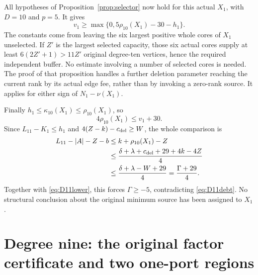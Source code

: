 \documentclass[11pt,a4paper]{article}
\theoremstyle{definition}
\begin{document}
All hypotheses of Proposition~\ref{prop:selector} now hold for this
actual \(X_1\), with \(D=10\) and \(p=5\).  It gives
\[
 v_1\ge\max\{0,5\rho_{10}(X_1)-30-h_1\}.
\]
The constants come from leaving the six largest positive whole cores
of \(X_1\) unselected.  If \(Z'\) is the largest selected capacity,
those six actual cores supply at least \(6(2Z'+1)>11Z'\) original
degree-ten vertices, hence the required independent buffer.
No estimate involving a number of selected cores is needed.
The proof of that proposition handles a further deletion parameter
reaching the current rank by its actual edge fee, rather than by
invoking a zero-rank source.  It applies for either sign of
\(N_1-\nu(X_1)\).

Finally \(h_1\le\kappa_{10}(X_1)\le\rho_{10}(X_1)\), so
\[
 4\rho_{10}(X_1)\le v_1+30.
\]
Since \(L_{11}-K_1\le h_1\) and
\(4(Z-k)-c_{\rm del}\ge W\), the whole comparison is
\[
\begin{aligned}
 L_{11}-|A|-Z-b
 &\le k+\rho_{10}(X_1)-Z\\
 &\le \frac{\delta+\lambda+c_{\rm del}+29+4k-4Z}{4}\\
 &\le \frac{\delta+\lambda-W+29}{4}
  =\frac{\Gamma+29}{4}.
\end{aligned}
\]
Together with \eqref{eq:D11lower}, this forces \(\Gamma\ge-5\),
contradicting \eqref{eq:D11debt}.  No structural conclusion about the
original minimum source has been assigned to \(X_1\).

\section{Degree nine: the original factor certificate and two one-port regions}\label{app:D9}
\end{document}

